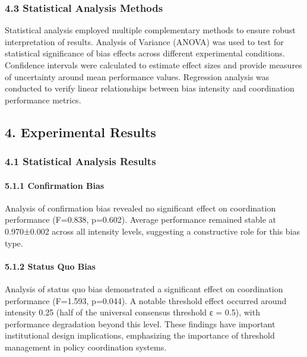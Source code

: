 \subsubsection{4.3 Statistical Analysis
Methods}\label{statistical-analysis-methods}

Statistical analysis employed multiple complementary methods to ensure
robust interpretation of results. Analysis of Variance (ANOVA) was used
to test for statistical significance of bias effects across different
experimental conditions. Confidence intervals were calculated to
estimate effect sizes and provide measures of uncertainty around mean
performance values. Regression analysis was conducted to verify linear
relationships between bias intensity and coordination performance
metrics.

\subsection{4. Experimental Results}\label{experimental-results}

\subsubsection{4.1 Statistical Analysis
Results}\label{statistical-analysis-results}

\paragraph{5.1.1 Confirmation Bias}\label{confirmation-bias-1}

Analysis of confirmation bias revealed no significant effect on
coordination performance (F=0.838, p=0.602). Average performance
remained stable at 0.970±0.002 across all intensity levels, suggesting a
constructive role for this bias type.

\paragraph{5.1.2 Status Quo Bias}\label{status-quo-bias-1}

Analysis of status quo bias demonstrated a significant effect on
coordination performance (F=1.593, p=0.044). A notable threshold effect
occurred around intensity 0.25 (half of the universal consensus
threshold ε = 0.5), with performance degradation beyond this level.
These findings have important institutional design implications,
emphasizing the importance of threshold management in policy
coordination systems.

